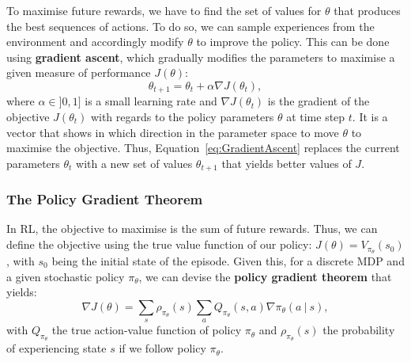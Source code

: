 To maximise future rewards, we have to find the set of values for $\theta$ that produces the best sequences of actions. To do so, we can sample experiences from the environment and accordingly modify $\theta$ to improve the policy. This can be done using \textbf{gradient ascent}, which gradually modifies the parameters to maximise a given measure of performance $J(\theta)$:
\begin{equation}
    \theta_{t+1}=\theta_t+\alpha\nabla J(\theta_t),
    \label{eq:GradientAscent}
\end{equation}
where $\alpha\in]0,1]$ is a small learning rate and $\nabla J(\theta_t)$ is the gradient of the objective $J(\theta_t)$ with regards to the policy parameters $\theta$ at time step $t$. It is a vector that shows in which direction in the parameter space to move $\theta$ to maximise the objective. Thus, Equation~\ref{eq:GradientAscent} replaces the current parameters $\theta_t$ with a new set of values $\theta_{t+1}$ that yields better values of $J$. 



\subsubsection{The Policy Gradient Theorem}\label{sec:Policy:PolicyGradientTheorem}

In RL, the objective to maximise is the sum of future rewards. Thus, we can define the objective using the true value function of our policy: $J(\theta)=V_{\pi_{\theta}}(s_0)$, with $s_0$ being the initial state of the episode. Given this, for a discrete MDP and a given stochastic policy $\pi_{\theta}$, we can devise the \textbf{policy gradient theorem} that yields:
\begin{equation}
    \nabla J(\theta)=\sum_s\rho_{\pi_{\theta}}(s)\sum_aQ_{\pi_{\theta}}(s,a)\nabla\pi_\theta(a\ |\ s),
    \label{eq:PolicyGradient:Theorem}
\end{equation}
with $Q_{\pi_{\theta}}$ the true action-value function of policy $\pi_{\theta}$ and $\rho_{\pi_{\theta}}(s)$ the probability of experiencing state $s$ if we follow policy $\pi_{\theta}$. 

